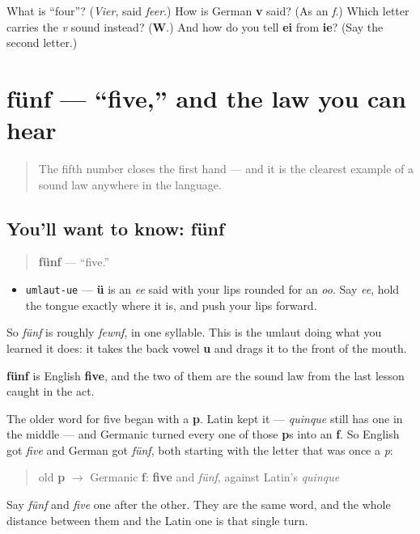 \begin{tcolorbox}[breakable,colback=teal!4,colframe=teal!35!black,title={Before you move on}]
What is \textquotedblleft{}four\textquotedblright{}? (\emph{Vier}, said \emph{feer}.) How is German \textbf{v} said? (As an \emph{f}.) Which letter carries the \emph{v} sound instead? (\textbf{W}.) And how do you tell \textbf{ei} from \textbf{ie}? (Say the second letter.)
\end{tcolorbox}
\section[fünf]{fünf — \textquotedblleft{}five,\textquotedblright{} and the law you can hear}

\label{lesson:GE-C06-fuenf}



\begin{quote}
The fifth number closes the first hand — and it is the clearest example of a sound law anywhere in the language.
\end{quote}

\subsection*{You'll want to know: fünf}
\begin{quote}
\textbf{fünf} — \textquotedblleft{}five.\textquotedblright{}
\end{quote}

\begin{sounds}
\begin{itemize}
\raggedright
  \item \texttt{umlaut-ue} — \textbf{ü} is an \emph{ee} said with your lips rounded for an \emph{oo}. Say \emph{ee}, hold the tongue exactly where it is, and push your lips forward.
\end{itemize}

So \emph{fünf} is roughly \emph{fewnf}, in one syllable. This is the umlaut doing what you learned it does: it takes the back vowel \textbf{u} and drags it to the front of the mouth.
\end{sounds}

\begin{cousinweb}
\textbf{fünf} is English \textbf{five}, and the two of them are the sound law from the last lesson caught in the act.

The older word for five began with a \textbf{p}. Latin kept it — \emph{quinque} still has one in the middle — and Germanic turned every one of those \textbf{p}s into an \textbf{f}. So English got \emph{five} and German got \emph{fünf}, both starting with the letter that was once a \emph{p}:

\begin{quote}
old \textbf{p} $\to$ Germanic \textbf{f}: \textbf{five} and \emph{fünf}, against Latin's \emph{quinque}
\end{quote}

Say \emph{fünf} and \emph{five} one after the other. They are the same word, and the whole distance between them and the Latin one is that single turn.
\end{cousinweb}

